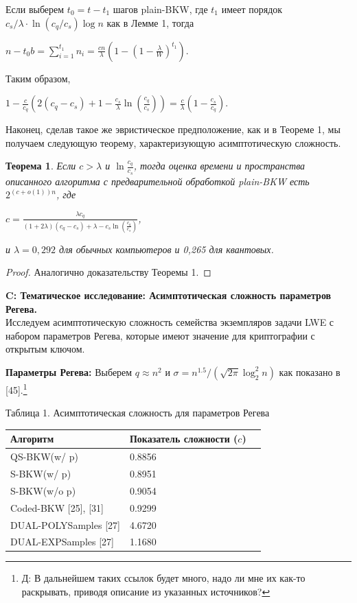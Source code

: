\documentclass[a4paper,11pt]{article}
\newtheorem{theorem}{Теорема}
\begin{document}
Если выберем $t_0=t - t_1$ шагов plain-BKW, где $t_1$ имеет порядок $c_s/\lambda \cdot \ln{(c_q/c_s)} \log{n}$ как в Лемме 1, тогда
\begin{center}
$n - t_0b = \sum_{i=1}^{t_1} n_i= \frac{cn}{\lambda}(1 - (1 - \frac{\lambda}{W})^{t_1})$.
\end{center}

Таким образом,
\begin{center}
$1 - \frac{c}{c_q}(2(c_q - c_s) + 1 - \frac{c_s}{\lambda}\ln{(\frac{c_q}{c_s})}) = \frac{c}{\lambda}(1 - \frac{c_s}{c_q})$.
\end{center}

Наконец, сделав такое же эвристическое предположение, как и в Теореме 1, мы получаем следующую теорему, характеризующую асимптотическую сложность.
\begin{theorem}
Если $c > \lambda$ и $\ln{\frac{c_q}{c_s}}$, тогда оценка времени и пространства описанного алгоритма с предварительной обработкой plain-BKW есть $2^{(c+o(1))n}$, где
\begin{center}
$c = \frac{\lambda c_q}{(1 + 2\lambda)(c_q - c_s) + \lambda - c_s\ln{(\frac{c_q}{c_s})}}$,
\end{center}
и $\lambda=0,292$ для обычных компьютеров и 0,265 для квантовых.
\end{theorem}

\begin{proof}
Аналогично доказательству Теоремы 1.
\end{proof}

\textbf{C: Тематическое исследование: Асимптотическая сложность параметров Регева.}\\

Исследуем асимптотическую сложность семейства экземпляров задачи LWE с набором параметров Регева, которые имеют значение для криптографии с открытым ключом.

\textbf{Параметры Регева:} Выберем $q \approx n^2$  и $\sigma = n^{1.5}/(\sqrt{2 \pi} \log_2^2{n})$ как показано в [45].\footnote{Д: В дальнейшем таких ссылок будет много, надо ли мне их как-то раскрывать, приводя описание из указанных источников?}

\begin{center}
Таблица 1. Асимптотическая сложность для параметров Регева
\begin{tabular}{ | l | l | l | }
\hline
Алгоритм & Показатель сложности ($c$) \\ \hline
QS-BKW(w/ p) & 0.8856 \\
S-BKW(w/ p) & 0.8951 \\
S-BKW(w/o p) & 0.9054 \\
Coded-BKW [25], [31] & 0.9299 \\
DUAL-POLYSamples [27] & 4.6720\\
DUAL-EXPSamples [27] & 1.1680\\
\hline
\end{tabular}
\end{center}
\end{document}

